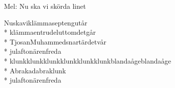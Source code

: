 \begin{SongText}[Nuskaviklämmasepten]
    \begin{SongInfo}
        Mel: Nu ska vi skörda linet
    \end{SongInfo}
    \begin{SongVerse}
        Nuskaviklämmaseptengutår\\*%
        klämmaentrudeluttomdetgår\\*%
        TjosanMuhammedsnartärdetvår\\*%
        julaftonärenfreda\\*%
        klunkklunkklunkklunkklunkklunkblandaågeblandaåge\\*%
        Abrakadabraklunk\\*%
        julaftonärenfreda
    \end{SongVerse}
\end{SongText}
